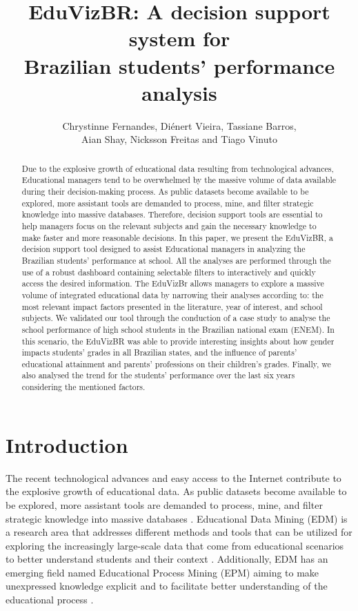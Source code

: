 \documentclass[12pt]{article}
\title{EduVizBR: A decision support system for \\ Brazilian students' performance analysis}
\author{Chrystinne Fernandes\inst{1}, Diénert Vieira\inst{1}, Tassiane Barros\inst{1}, \\ Aian Shay\inst{1}, 
Nicksson Freitas\inst{2} and Tiago Vinuto\inst{2}}
\begin{document}
 
\maketitle


\begin{abstract} 
Due to the explosive growth of educational data resulting from technological advances, Educational managers tend to be overwhelmed by the massive volume of data available during their decision-making process. 
As public datasets become available to be explored, more assistant tools are demanded to process, mine, and filter strategic knowledge into massive databases. Therefore, decision support tools are essential to help managers focus on the relevant subjects and gain the necessary knowledge to make faster and more reasonable decisions. 
In this paper, we present the EduVizBR, a decision support tool designed to assist Educational managers in analyzing the Brazilian students' performance at school. All the analyses are performed through the use of a robust dashboard containing selectable filters to interactively and quickly access the desired information. The EduVizBr allows managers to explore a massive volume of integrated educational data by narrowing their analyses according to: the most relevant impact factors presented in the literature, year of interest, and school subjects. We validated our tool through the conduction of a case study to analyse the school performance of high school students in the Brazilian national exam (ENEM). In this scenario, the EduVizBR was able to provide interesting insights about how gender impacts students' grades in all Brazilian states, and the influence of parents' educational attainment and parents' professions on their children's grades. Finally, we also analysed the trend for the students' performance over the last six years considering the mentioned factors.  

\end{abstract}


\section{Introduction} 


The recent technological advances and easy access to the Internet contribute to the explosive growth of educational data. As public datasets become available to be explored, more assistant tools are demanded to process, mine, and filter strategic knowledge into massive databases  \cite{Terrin2014}. Educational Data Mining (EDM) is a research area that addresses different methods and tools that can be utilized for exploring the increasingly large-scale data that come from educational scenarios to better understand students and their context \cite{Romero2020}. Additionally, EDM has an emerging field named Educational Process Mining (EPM) aiming to make unexpressed knowledge explicit and to facilitate better understanding of the educational process \cite{Bogarn2017}.
\end{document}
